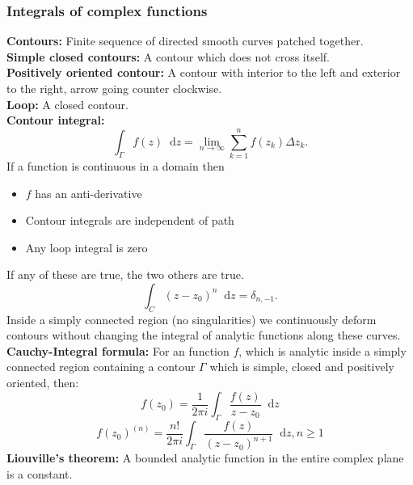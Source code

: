 \documentclass[a4paper, 10pt]{article}
\newcommand*\diff{\mathop{}\!\mathrm{d}}
\begin{document}
\begin{multicols*}{3}
\subsubsection*{Integrals of complex functions}
\textbf{Contours:} Finite sequence of directed smooth curves patched together.\\
\textbf{Simple closed contours:} A contour which does not cross itself.\\
\textbf{Positively oriented contour:} A contour with interior to the left and exterior to the right, arrow going counter clockwise.\\
\textbf{Loop:} A closed contour.\\
\textbf{Contour integral:}
\begin{equation*}
  \int_{\Gamma} f(z) \diff z = \lim_{n\to\infty} \sum_{k=1}^{n} f(z_k) \Delta z_k.
\end{equation*}
If a function is continuous in a domain then
\begin{itemize}
  \item $f$ has an anti-derivative
  \item Contour integrals are independent of path
  \item Any loop integral is zero
\end{itemize}
If any of these are true, the two others are true.\\
\begin{equation*}
  \int_{C} (z-z_0)^n \diff z = \delta_{n, -1}.
\end{equation*}
Inside a simply connected region (no singularities) we continuously deform contours without changing the integral of analytic functions along these curves.\\
\textbf{Cauchy-Integral formula:}
For an function $f$, which is analytic inside a simply connected region containing a contour $\Gamma$ which is simple, closed and positively oriented, then:
\begin{equation*}
  f(z_0) = \frac{1}{2\pi i} \int_{\Gamma} \frac{f(z)}{z-z_0} \diff z
\end{equation*}
\begin{equation*}
  f(z_0)^{(n)} = \frac{n!}{2\pi i} \int_{\Gamma} \frac{f(z)}{(z-z_0)^{n+1}} \diff z, n\geq 1
\end{equation*}
\textbf{Liouville's theorem:} A bounded analytic function in the entire complex plane is a constant.\\

\end{multicols*}
\end{document}
